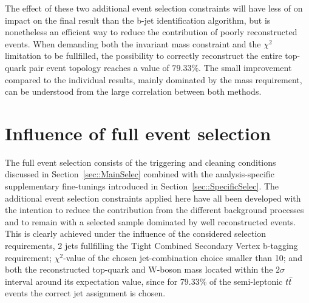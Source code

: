 The effect of these two additional event selection constraints will have less of on impact on the final result than the b-jet identification algorithm, but is nonetheless an efficient way to reduce the contribution of poorly reconstructed events.
When demanding both the invariant mass constraint and the $\chi^{2}$ limitation to be fullfilled, the possibility to correctly reconstruct the entire top-quark pair event topology reaches a value of $79.33\%$.
The small improvement compared to the individual results, mainly dominated by the mass requirement, can be understood from the large correlation between both methods.

\section{Influence of full event selection} %
The full event selection consists of the triggering and cleaning conditions discussed in Section~\ref{sec::MainSelec} combined with the analysis-specific supplementary fine-tunings introduced in Section~\ref{sec::SpecificSelec}.
The additional event selection constraints applied here have all been developed with the intention to reduce the contribution from the different background processes and to remain with a selected sample dominated by well reconstructed events.
This is clearly achieved under the influence of the considered selection requirements, 2 jets fullfilling the Tight Combined Secondary Vertex b-tagging requirement; $\chi^{2}$-value of the chosen jet-combination choice smaller than 10; and both the reconstructed top-quark and W-boson mass located within the $2\sigma$ interval around its expectation value, since for 79.33$\%$ of the semi-leptonic $t\bar{t}$ events the correct jet assignment is chosen.
\\

